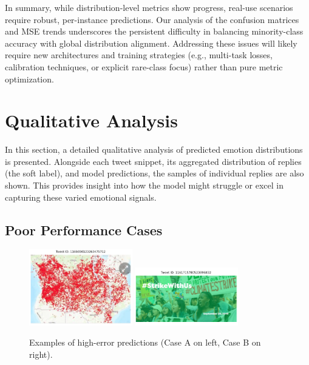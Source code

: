 In summary, while distribution-level metrics show progress, real-use scenarios require robust, per-instance predictions. Our analysis of the confusion matrices and MSE trends underscores the persistent difficulty in balancing minority-class accuracy with global distribution alignment. Addressing these issues will likely require new architectures and training strategies (e.g., multi-task losses, calibration techniques, or explicit rare-class focus) rather than pure metric optimization.



\section{Qualitative Analysis}
\label{sec:qualitative}

In this section, a detailed qualitative analysis of predicted emotion distributions is presented. Alongside each tweet snippet, its aggregated distribution of replies (the soft label), and model predictions, the samples of individual replies are also shown. This provides insight into how the model might struggle or excel in capturing these varied emotional signals.

\vspace{1em}
\subsection*{Poor Performance Cases}

\begin{figure}[ht]
    \centering
    \includegraphics[width=0.4\textwidth]{images/bad1.png} 
    \hfill
    \includegraphics[width=0.4\textwidth]{images/bad2.png}
    \caption{Examples of high-error predictions (Case A on left, Case B on right).}
    \label{fig:bad_cases}
\end{figure}


